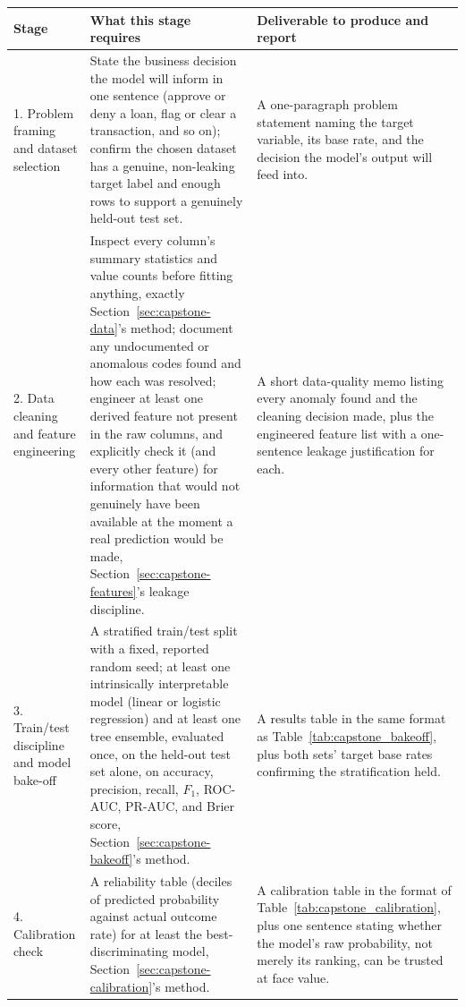 \documentclass[../ai_in_finance]{subfiles}
\begin{document}
\begin{table}[htbp]
\centering
\begin{lrbox}{\bookmeasuredbox}
\small
\begin{tabular}{p{2.1cm}p{6.3cm}p{5.6cm}}
\toprule
Stage & What this stage requires & Deliverable to produce and report \\
\midrule
1. Problem framing and dataset selection & State the business decision the model will inform in one sentence (approve or deny a loan, flag or clear a transaction, and so on); confirm the chosen dataset has a genuine, non-leaking target label and enough rows to support a genuinely held-out test set. & A one-paragraph problem statement naming the target variable, its base rate, and the decision the model's output will feed into. \\
2. Data cleaning and feature engineering & Inspect every column's summary statistics and value counts before fitting anything, exactly Section~\ref{sec:capstone-data}'s method; document any undocumented or anomalous codes found and how each was resolved; engineer at least one derived feature not present in the raw columns, and explicitly check it (and every other feature) for information that would not genuinely have been available at the moment a real prediction would be made, Section~\ref{sec:capstone-features}'s leakage discipline. & A short data-quality memo listing every anomaly found and the cleaning decision made, plus the engineered feature list with a one-sentence leakage justification for each. \\
3. Train/test discipline and model bake-off & A stratified train/test split with a fixed, reported random seed; at least one intrinsically interpretable model (linear or logistic regression) and at least one tree ensemble, evaluated once, on the held-out test set alone, on accuracy, precision, recall, $F_1$, ROC-AUC, PR-AUC, and Brier score, Section~\ref{sec:capstone-bakeoff}'s method. & A results table in the same format as Table~\ref{tab:capstone_bakeoff}, plus both sets' target base rates confirming the stratification held. \\
4. Calibration check & A reliability table (deciles of predicted probability against actual outcome rate) for at least the best-discriminating model, Section~\ref{sec:capstone-calibration}'s method. & A calibration table in the format of Table~\ref{tab:capstone_calibration}, plus one sentence stating whether the model's raw probability, not merely its ranking, can be trusted at face value. \\

\end{tabular}
\end{lrbox}
\end{table}
\end{document}
